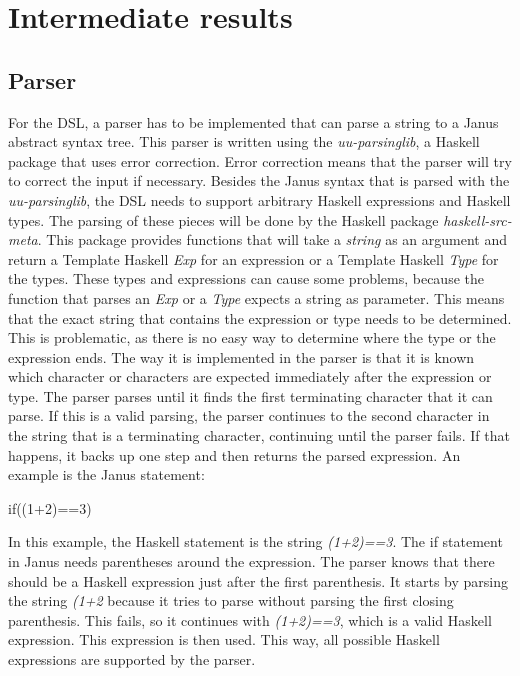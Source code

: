 \documentclass[12pt,a4paper]{article}
\begin{document}
\newpage

\section{Intermediate results}

\subsection{Parser}
For the DSL, a parser has to be implemented that can parse a string to a Janus abstract syntax tree. This parser is written using the \textit{uu-parsinglib}, a Haskell package that uses error correction. Error correction means that the parser will try to correct the input if necessary. Besides the Janus syntax that is parsed with the \textit{uu-parsinglib}, the DSL needs to support arbitrary Haskell expressions and Haskell types. The parsing of these pieces will be done by the Haskell package \textit{haskell-src-meta}. This package provides functions that will take a \textit{string} as an argument and return a Template Haskell \textit{Exp} for an expression or a Template Haskell \textit{Type} for the types. These types and expressions can cause some problems, because the function that parses an \textit{Exp} or a \textit{Type} expects a string as parameter. This means that the exact string that contains the expression or type needs to be determined. This is problematic, as there is no easy way to determine where the type or the expression ends. The way it is implemented in the parser is that it is known which character or characters are expected immediately after the expression or type. The parser parses until it finds the first terminating character that it can parse. If this is a valid parsing, the parser continues to the second character in the string that is a terminating character, continuing until the parser fails. If that happens, it backs up one step and then returns the parsed expression. An example is the Janus statement:
    \begin{displayquote}
        if((1+2)==3)
    \end{displayquote}
In this example, the Haskell statement is the string \textit{(1+2)==3}. The if statement in Janus needs parentheses around the expression. The parser knows that there should be a Haskell expression just after the first parenthesis. It starts by parsing the string \textit{(1+2} because it tries to parse without parsing the first closing parenthesis. This fails, so it continues with \textit{(1+2)==3}, which is a valid Haskell expression. This expression is then used. This way, all possible Haskell expressions are supported by the parser.
\end{document}
